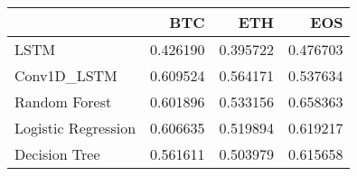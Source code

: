 \begin{tabular}{lrrr}
\toprule
{} &       BTC &       ETH &       EOS \\
\midrule
LSTM                &  0.426190 &  0.395722 &  0.476703 \\
Conv1D\_LSTM         &  0.609524 &  0.564171 &  0.537634 \\
Random Forest       &  0.601896 &  0.533156 &  0.658363 \\
Logistic Regression &  0.606635 &  0.519894 &  0.619217 \\
Decision Tree       &  0.561611 &  0.503979 &  0.615658 \\
\bottomrule
\end{tabular}
